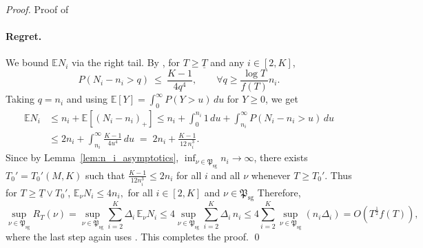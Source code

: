 \documentclass[10pt,a4paper]{amsart}
\newcommand{\E}{{\mathbb{E}}}
\begin{document}
\begin{proof}{Proof of }
\paragraph{Regret.}
We bound $\E N_i$ via the right tail. By , for $T\ge \underline T$ and
any $i\in[2, K]$,
\[
P(N_i-n_i>q)\ \le\ \frac{K-1}{4q^4},
\qquad \forall q\ge \frac{\log T}{f(T)}n_i.
\]
Taking $q=n_i$ and using $\E[Y]=\int_0^\infty P(Y>u)\,du$ for $Y\ge 0$, we get
\begin{align*}
\E N_i
&\le n_i + \E[(N_i-n_i)_+]
 \le n_i + \int_0^{n_i} 1\,du + \int_{n_i}^{\infty} P(N_i-n_i>u)\,du \\
&\le 2n_i + \int_{n_i}^{\infty} \frac{K-1}{4u^4}\,du  \;=\;2n_i + \frac{K-1}{12\,n_i^3}.
\end{align*}
Since by Lemma~\ref{lem:n_i_asymptotics}, $\inf_{\nu\in\mathfrak{P}_{\text{sg}}}n_i\to\infty$, there exists $T_0'=T_0'( M, K)$ such that $\frac{K-1}{12n_i^3}\le 2n_i$ for all $i$ and all $\nu$ whenever $T\ge T_0'$. Thus for $T\ge \underline T\vee T_0'$, $\E_{\nu} N_i \le 4n_i,$ for all $i\in[2, K]$ and $\nu \in \mathfrak{P}_{\text{sg}}$ Therefore,
\[
\sup_{\nu\in\mathfrak{P}_{\text{sg}}} R_T(\nu)
=\sup_{\nu\in\mathfrak{P}_{\text{sg}}}\sum_{i=2}^K \Delta_i\,\E_{\nu} N_i
\le 4\sup_{\nu\in\mathfrak{P}_{\text{sg}}}\sum_{i=2}^K \Delta_i\,n_i
\le 4\sum_{i=2}^K \sup_{\nu\in\mathfrak{P}_{\text{sg}}}(n_i\Delta_i)
=O\!\left(T^{\frac12}f(T)\right),
\]
where the last step again uses . This completes the proof. \qed
\end{proof}
\end{document}
